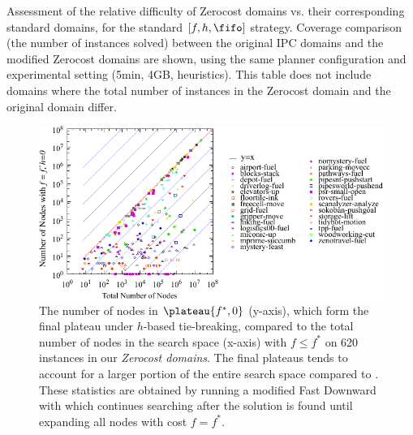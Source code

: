 
\begin{table}[tbp]
 \centering
 
 \caption{
 Assessment of the relative difficulty of Zerocost domains vs. their corresponding standard domains, for the standard $[f,h,\fifo]$ strategy.
 Coverage comparison (the number of instances solved) 
 between the original IPC domains and the modified Zerocost domains are shown, 
 using the same planner configuration and experimental setting (5min, 4GB, \lmcut heuristics).
 This table does not include domains where the total number of instances
 in the Zerocost domain  and the original domain differ. 
 }
 \label{tbl:lmcut-zerocost-std}
\end{table}

\begin{figure}[tbp]
  \centering
  \includegraphics{tables/aaai16-frontier/zerocost/lmcut_frontier-front.pdf}
  \caption{
 The number of nodes in $\plateau{f^*, 0}$ (y-axis), which form
  the final plateau under $h$-based tie-breaking, compared to
 the total number of nodes in the search space (x-axis) with
 $f\leq f^*$ on 620 instances in our \emph{Zerocost domains}.
 The final plateaus tends to account for a larger portion of the
 entire search space compared to .
 These statistics are obtained by running a modified Fast Downward with
 \lmcut which continues searching after the solution is found
 until expanding all nodes with cost $f=f^*$.
 }
 \label{fig:plateau-zerocost}
\end{figure}



